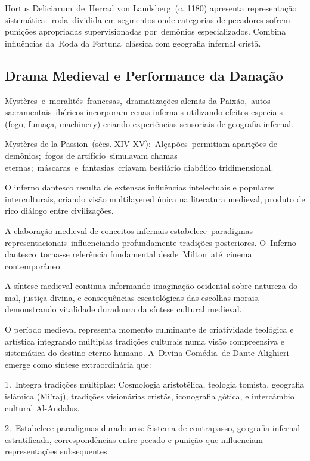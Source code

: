 Hortus Deliciarum de Herrad von Landsberg (c. 1180) apresenta representação sistemática: roda dividida em segmentos onde categorias de pecadores sofrem punições apropriadas supervisionadas por demônios especializados. Combina influências da Roda da Fortuna clássica com geografia infernal cristã.

\subsection{Drama Medieval e Performance da Danação}

Mystères e moralités francesas, dramatizações alemãs da Paixão, autos sacramentais ibéricos incorporam cenas infernais utilizando efeitos especiais (fogo, fumaça, machinery) criando experiências sensoriais de geografia infernal.

Mystères de la Passion (sécs. XIV-XV): Alçapões permitiam aparições de demônios; fogos de artifício simulavam chamas eternas; máscaras e fantasias criavam bestiário diabólico tridimensional.

O inferno dantesco resulta de extensas influências intelectuais e populares interculturais, criando visão multilayered única na literatura medieval, produto de rico diálogo entre civilizações.

A elaboração medieval de conceitos infernais estabelece paradigmas representacionais influenciando profundamente tradições posteriores. O Inferno dantesco torna-se referência fundamental desde Milton até cinema contemporâneo.

A síntese medieval continua informando imaginação ocidental sobre natureza do mal, justiça divina, e consequências escatológicas das escolhas morais, demonstrando vitalidade duradoura da síntese cultural medieval.

O período medieval representa momento culminante de criatividade teológica e artística integrando múltiplas tradições culturais numa visão compreensiva e sistemática do destino eterno humano. A Divina Comédia de Dante Alighieri emerge como síntese extraordinária que:

1. Integra tradições múltiplas: Cosmologia aristotélica, teologia tomista, geografia islâmica (Mi'raj), tradições visionárias cristãs, iconografia gótica, e intercâmbio cultural Al-Andalus.

2. Estabelece paradigmas duradouros: Sistema de contrapasso, geografia infernal estratificada, correspondências entre pecado e punição que influenciam representações subsequentes.

